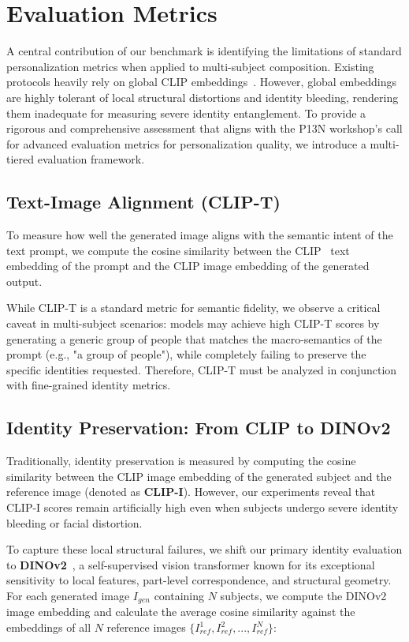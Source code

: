 \section{Evaluation Metrics}

A central contribution of our benchmark is identifying the limitations of standard personalization metrics when applied to multi-subject composition. Existing protocols heavily rely on global CLIP embeddings~\cite{radford2021learning}. However, global embeddings are highly tolerant of local structural distortions and identity bleeding, rendering them inadequate for measuring severe identity entanglement. To provide a rigorous and comprehensive assessment that aligns with the P13N workshop's call for advanced evaluation metrics for personalization quality, we introduce a multi-tiered evaluation framework.

\subsection{Text-Image Alignment (CLIP-T)}
To measure how well the generated image aligns with the semantic intent of the text prompt, we compute the cosine similarity between the CLIP~\cite{radford2021learning} text embedding of the prompt and the CLIP image embedding of the generated output. 

While CLIP-T is a standard metric for semantic fidelity, we observe a critical caveat in multi-subject scenarios: models may achieve high CLIP-T scores by generating a generic group of people that matches the macro-semantics of the prompt (e.g., "a group of people"), while completely failing to preserve the specific identities requested. Therefore, CLIP-T must be analyzed in conjunction with fine-grained identity metrics.

\subsection{Identity Preservation: From CLIP to DINOv2}
Traditionally, identity preservation is measured by computing the cosine similarity between the CLIP image embedding of the generated subject and the reference image (denoted as \textbf{CLIP-I}). However, our experiments reveal that CLIP-I scores remain artificially high even when subjects undergo severe identity bleeding or facial distortion.

To capture these local structural failures, we shift our primary identity evaluation to \textbf{DINOv2}~\cite{oquab2023dinov2}, a self-supervised vision transformer known for its exceptional sensitivity to local features, part-level correspondence, and structural geometry. For each generated image $I_{gen}$ containing $N$ subjects, we compute the DINOv2 image embedding and calculate the average cosine similarity against the embeddings of all $N$ reference images $\{I_{ref}^1, I_{ref}^2, ..., I_{ref}^N\}$:

